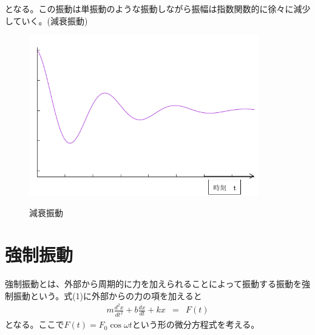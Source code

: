 となる。この振動は単振動のような振動しながら振幅は指数関数的に徐々に減少していく。(減衰振動)
\begin{figure}[H]
\centering
\includegraphics[height=7cm,clip]{kadono/image/gensui1.pdf}
\label{fig:ele1}
\caption{減衰振動}
\end{figure}


\section{強制振動}
強制振動とは、外部から周期的に力を加えられることによって振動する振動を強制振動という。式(1)に外部からの力の項を加えると
\begin{eqnarray}
m\frac{d^2x}{dt^2}+b \frac{dx}{dt} + kx&=& F(t)
\end{eqnarray}
となる。ここで$F(t)=F_0\cos {\omega t}$という形の微分方程式を考える。

